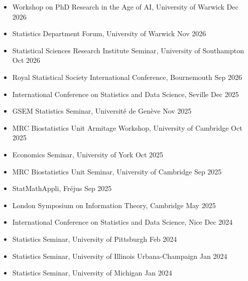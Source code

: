 \documentclass{wgu-cv}
\begin{document}
\begin{itemize}

  \item
    Workshop on PhD Research in the Age of AI,
    University of Warwick
    \hfill Dec 2026

  \item
    Statistics Department Forum,
    University of Warwick
    \hfill Nov 2026

  \item
    Statistical Sciences Research Institute Seminar,
    University of Southampton
    \hfill Oct 2026

  \item Royal Statistical Society International Conference,
    Bournemouth
    \hfill Sep 2026

  \item International Conference on Statistics and Data Science,
    Seville
    \hfill Dec 2025

  \item GSEM Statistics Seminar,
    Universit{\'e} de Gen{\`e}ve
    \hfill Nov 2025

  \item MRC Biostatistics Unit Armitage Workshop,
    University of Cambridge
    \hfill Oct 2025

  \item Economics Seminar,
    University of York
    \hfill Oct 2025

  \item MRC Biostatistics Unit Seminar,
    University of Cambridge
    \hfill Sep 2025

  \item StatMathAppli,
    Fr{\'e}jus
    \hfill Sep 2025

  \item London Symposium on Information Theory,
    Cambridge
    \hfill May 2025

  \item International Conference on Statistics and Data Science,
    Nice
    \hfill Dec 2024

  \item Statistics Seminar,
    University of Pittsburgh
    \hfill Feb 2024

  \item Statistics Seminar,
    University of Illinois Urbana-Champaign
    \hfill Jan 2024

  \item Statistics Seminar,
    University of Michigan
    \hfill Jan 2024


\end{itemize}
\end{document}
